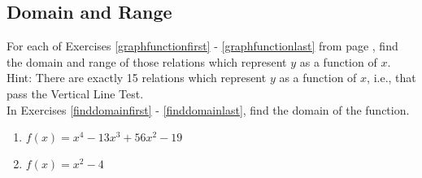 
\subsection{Domain and Range}

For each of Exercises \ref{graphfunctionfirst} - \ref{graphfunctionlast} from page \pageref{graphfunctionfirst}, find the domain and range of those relations which represent $y$ as a function of $x$.  Hint: There are exactly 15 relations which represent $y$ as a function of $x$, i.e., that pass the Vertical Line Test.\\

In Exercises \ref{finddomainfirst} - \ref{finddomainlast}, find the domain of the function.

\begin{multicols}{2}
\begin{enumerate}

\item $f(x) = x^{4} - 13x^{3} + 56x^{2} - 19$ \label{finddomainfirst}
\item  $f(x) = x^2 - 4$

\setcounter{HW}{\value{enumi}}
\end{enumerate}
\end{multicols}

